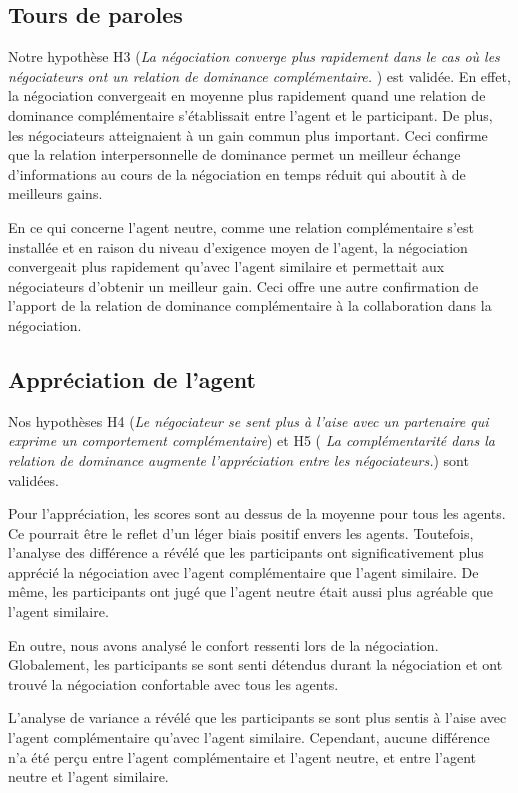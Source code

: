 	
	\subsection{Tours de paroles}
	Notre hypothèse H3 (\textit{La négociation converge plus rapidement dans le cas où les négociateurs ont un relation de dominance complémentaire. }) est validée. En effet, la négociation convergeait en moyenne plus rapidement quand une relation de dominance complémentaire s'établissait entre l'agent et le participant. De plus, les négociateurs atteignaient à un gain commun plus important. Ceci confirme que la relation interpersonnelle de dominance permet un meilleur échange d'informations au cours de la négociation en temps réduit qui aboutit à de meilleurs gains. 
	
	En ce qui concerne l'agent neutre, comme une relation complémentaire s'est installée et en raison du niveau d'exigence moyen de l'agent, la négociation convergeait plus rapidement qu'avec l'agent similaire et permettait aux négociateurs d'obtenir un meilleur gain. Ceci offre une autre confirmation de l'apport de la relation de dominance complémentaire à la collaboration dans la négociation. 
	
	\subsection{Appréciation de l'agent}
	Nos hypothèses H4 (\textit{Le négociateur se sent plus à l'aise avec un partenaire qui exprime un comportement complémentaire})  et H5 (\textit{ La complémentarité dans la relation de dominance augmente l'appréciation entre les négociateurs.}) sont validées. 
	
	Pour l’appréciation, les scores sont au dessus de la moyenne pour tous les agents. Ce pourrait être le reflet d’un léger biais positif envers les agents. Toutefois, l'analyse des différence a révélé que les participants ont significativement plus apprécié la négociation avec l'agent complémentaire que l'agent similaire. De même, les participants ont jugé que l'agent neutre était aussi plus agréable que l'agent similaire. 
	
	En outre, nous avons analysé le confort ressenti lors de la négociation. Globalement, les participants se sont senti détendus durant la négociation et ont trouvé la négociation confortable avec tous les agents.  
	
	L'analyse de variance a révélé que les participants se sont plus sentis à l'aise avec l'agent complémentaire qu'avec l'agent similaire. Cependant, aucune différence n'a été perçu entre l'agent complémentaire et l'agent neutre, et entre l'agent neutre et l'agent similaire.
	
